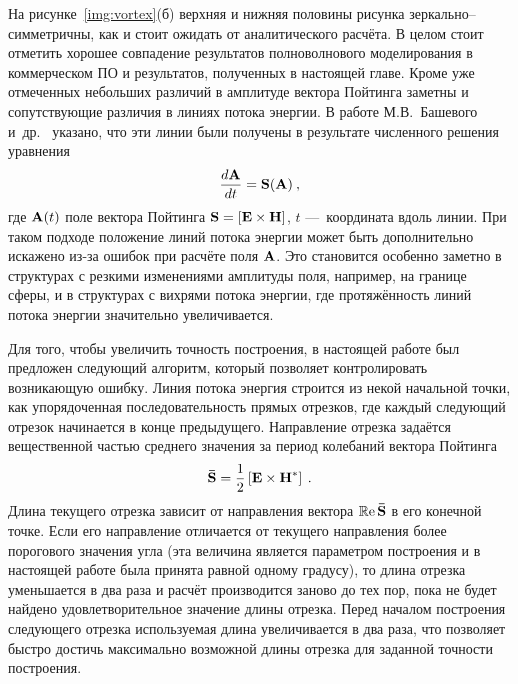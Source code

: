 На рисунке~\ref{img:vortex}(б) верхняя и нижняя половины рисунка
зеркально--симметричны, как и стоит ожидать от аналитического
расчёта. В целом стоит отметить хорошее совпадение результатов
полноволнового моделирования в коммерческом ПО
и результатов, полученных в настоящей главе.  Кроме уже отмеченных
небольших различий в амплитуде вектора Пойтинга заметны и
сопутствующие различия в линиях потока энергии. В работе
М.В.~Башевого и~др.~\cite{Bashevoy-2005} указано, что эти линии были
получены в результате численного решения уравнения
\begin{equation*}
  \frac{d\boldsymbol{\rm A}}{dt}=\boldsymbol{\rm S}(\boldsymbol{\rm A})\:,
\end{equation*}
где $\boldsymbol{\rm A}(t)$ поле вектора Пойтинга
$\boldsymbol{\rm S}=\left[\boldsymbol{\rm E}\times\boldsymbol{\rm H}\right]$, $t$
---~координата вдоль линии.  При таком подходе положение линий потока
энергии может быть дополнительно искажено из-за ошибок при расчёте
поля $\boldsymbol{\rm A}$. Это становится особенно заметно в структурах с
резкими изменениями амплитуды поля, например, на границе сферы, и в
структурах с вихрями потока энергии, где протяжённость линий потока
энергии значительно увеличивается.

Для того, чтобы увеличить точность построения, в настоящей работе был
предложен следующий алгоритм, который позволяет контролировать
возникающую ошибку. Линия потока энергия строится из некой начальной
точки, как упорядоченная последовательность прямых отрезков, где
каждый следующий отрезок начинается в конце предыдущего. Направление
отрезка задаётся вещественной частью среднего значения за период
колебаний вектора Пойтинга
\begin{equation*}
  \boldsymbol{\bar{\rm S}} = \frac{1}{2}
  \left[\boldsymbol{\rm E}\times\boldsymbol{\rm H}^*\right]\:.
\end{equation*}
Длина текущего отрезка зависит от направления вектора
$\operatorname{\mathbb{R}e}\boldsymbol{\bar{\rm S}}$ в его конечной
точке. Если его направление отличается от текущего направления более
порогового значения угла (эта величина является параметром построения
и в настоящей работе была принята равной одному градусу), то длина
отрезка уменьшается в два раза и расчёт производится заново до тех
пор, пока не будет найдено удовлетворительное значение длины
отрезка. Перед началом построения следующего отрезка используемая
длина увеличивается в два раза, что позволяет быстро достичь
максимально возможной длины отрезка для заданной точности
построения. 

